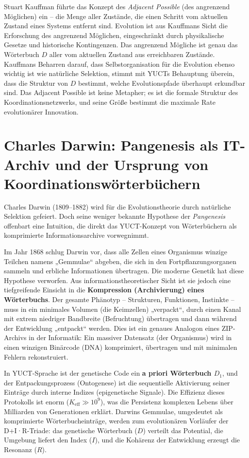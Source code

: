 \documentclass[12pt,a4paper]{article}
\begin{document}
	Stuart Kauffman führte das Konzept des \emph{Adjacent Possible} (des angrenzend Möglichen) ein – die Menge aller Zustände, die einen Schritt vom aktuellen Zustand eines Systems entfernt sind. Evolution ist aus Kauffmans Sicht die Erforschung des angrenzend Möglichen, eingeschränkt durch physikalische Gesetze und historische Kontingenzen. Das angrenzend Mögliche ist genau das Wörterbuch \(D\) aller vom aktuellen Zustand aus erreichbaren Zustände. Kauffmans Beharren darauf, dass Selbstorganisation für die Evolution ebenso wichtig ist wie natürliche Selektion, stimmt mit YUCTs Behauptung überein, dass die Struktur von \(D\) bestimmt, welche Evolutionspfade überhaupt erkundbar sind. Das Adjacent Possible ist keine Metapher; es ist die formale Struktur des Koordinationsnetzwerks, und seine Größe bestimmt die maximale Rate evolutionärer Innovation.
	
	\section{Charles Darwin: Pangenesis als IT-Archiv und der Ursprung von Koordinationswörterbüchern}
	
	Charles Darwin (1809–1882) wird für die Evolutionstheorie durch natürliche Selektion gefeiert. Doch seine weniger bekannte Hypothese der \emph{Pangenesis} offenbart eine Intuition, die direkt das YUCT-Konzept von Wörterbüchern als komprimierte Informationsarchive vorwegnimmt.
	
	Im Jahr 1868 schlug Darwin vor, dass alle Zellen eines Organismus winzige Teilchen namens „Gemmulae“ abgeben, die sich in den Fortpflanzungsorganen sammeln und erbliche Informationen übertragen. Die moderne Genetik hat diese Hypothese verworfen. Aus informationstheoretischer Sicht ist sie jedoch eine tiefgreifende Einsicht in die \textbf{Kompression (Archivierung) eines Wörterbuchs}. Der gesamte Phänotyp – Strukturen, Funktionen, Instinkte – muss in ein minimales Volumen (die Keimzellen) „verpackt“, durch einen Kanal mit extrem niedriger Bandbreite (Befruchtung) übertragen und dann während der Entwicklung „entpackt“ werden. Dies ist ein genaues Analogon eines ZIP-Archivs in der Informatik: Ein massiver Datensatz (der Organismus) wird in einen winzigen Binärcode (DNA) komprimiert, übertragen und mit minimalen Fehlern rekonstruiert.
	
	In YUCT-Sprache ist der genetische Code ein \textbf{a priori Wörterbuch \(D_1\)}, und der Entpackungsprozess (Ontogenese) ist die sequentielle Aktivierung seiner Einträge durch interne Indizes (epigenetische Signale). Die Effizienz dieses Protokolls ist enorm (\(K_{\mathrm{eff}} \gg 10^9\)), was die Persistenz komplexen Lebens über Milliarden von Generationen erklärt. Darwins Gemmulae, umgedeutet als komprimierte Wörterbucheinträge, werden zum evolutionären Vorläufer der D+I·R-Triade: das genetische Wörterbuch (\(D\)) verteilt das Potential, die Umgebung liefert den Index (\(I\)), und die Kohärenz der Entwicklung erzeugt die Resonanz (\(R\)).
	
\end{document}
